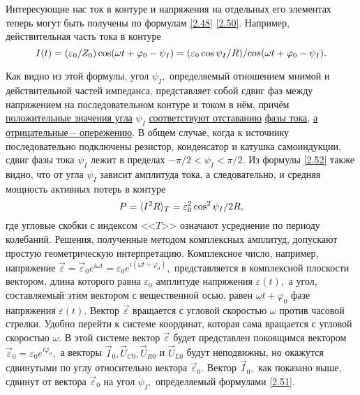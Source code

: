 Интересующие нас ток в контуре и напряжения на отдельных его элементах теперь могут быть получены по формулам \eqref{2.48} \important{--} \eqref{2.50}. Например, действительная часть тока в контуре 
\begin{equation}
	\eqmark{2.52}
	I(t)=(\varepsilon_0/Z_0)\cos(\omega t+\varphi_0-\psi_I)=(\varepsilon_0\cos\psi_I/R)/cos(\omega t+\varphi_0-\psi_I).
\end{equation}

Как видно из этой формулы, угол $\psi_I,$ определяемый отношением мнимой и действительной частей импеданса, представляет собой сдвиг фаз между напряжением на последовательном контуре и током в нём, причём \underline{положительные значения угла} $\psi_I$ \underline{соответствуют отставанию} \underline{фазы тока}, \underline{а отрицательные – опережению}. В общем случае, когда к источнику последовательно подключены резистор, конденсатор и катушка самоиндукции, сдвиг фазы тока $\psi_I$ лежит в пределах $-\pi/2<\psi_I<\pi/2.$ Из формулы \eqref{2.52} также видно, что от угла $\psi_I$ зависит амплитуда тока, а следовательно, и средняя мощность активных потерь в контуре
\begin{equation}\eqmark{2.53}
	P=\langle I^2R\rangle_T=\varepsilon_0^2\cos^2\psi_I/2R,
\end{equation}
где угловые скобки с индексом <<$T$>> означают усреднение по периоду колебаний.
Решения, полученные методом комплексных амплитуд, допускают простую геометрическую интерпретацию. Комплексное число, например, напряжение $\vec \varepsilon=\vec \varepsilon_0e^{i\omega t}=\varepsilon_0e^{i(\omega t+\varphi_0)},$ представляется в комплексной плоскости вектором, длина которого равна $\varepsilon_0$ \important{--} амплитуде напряжения $\varepsilon(t),$ а угол, составляемый этим вектором с вещественной осью, равен $\omega t+\varphi_0$ \important{--} фазе напряжения $\varepsilon(t).$ Вектор $\vec \varepsilon$ вращается с угловой скоростью $\omega$ против часовой стрелки. Удобно перейти к системе координат, которая сама вращается с угловой скоростью $\omega.$ В этой системе вектор $\vec \varepsilon$ будет представлен покоящимся вектором $\vec \varepsilon_0=\varepsilon_0e^{i\varphi_0},$ а векторы $\vec I_0, \vec U_{C0}, \vec U_{R0}$ и $\vec U_{L0}$ будут неподвижны, но окажутся сдвинутыми по углу относительно вектора $\vec \varepsilon_0.$ Вектор $\vec I_0,$ как показано выше, сдвинут от вектора $\vec \varepsilon_0$ на угол $\psi_I,$ определяемый формулами \eqref{2.51}.

